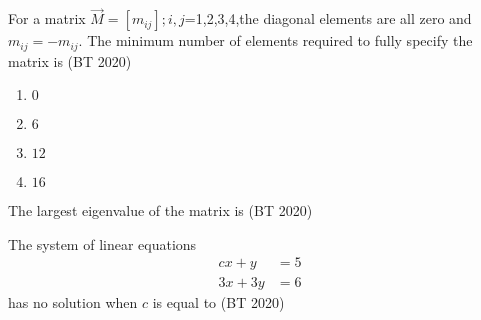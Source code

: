 \item  For a matrix $\vec{M}={[m_{ij}]};i,j$=1,2,3,4,the diagonal elements are all zero and ${m_{ij}}=-{m_{ij}}$. The minimum number of elements required to fully specify the matrix is
\hfill(BT 2020)
\begin{multicols}{4}
\begin{enumerate}
\item $0$
\item $6$
\item $12$
\item $16$
\end{enumerate} 
\end{multicols}
\item The largest eigenvalue of the matrix 
is   \hfill(BT 2020)
\item The system of linear equations
\begin{align*}
	cx+y&=5\\
	3x+3y&=6
\end{align*}
has no solution when $c$ is equal to \hfill(BT 2020)

